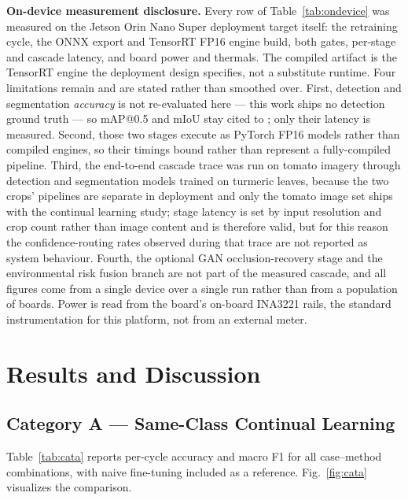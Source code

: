 \documentclass[journal]{IEEEtran}
\begin{document}
\textbf{On-device measurement disclosure.} Every row of
Table~\ref{tab:ondevice} was measured on the Jetson Orin Nano Super deployment
target itself: the retraining cycle, the ONNX export and TensorRT FP16 engine
build, both gates, per-stage and cascade latency, and board power and thermals.
The compiled artifact is the TensorRT engine the deployment design specifies, not a
substitute runtime. Four limitations remain and are stated rather than smoothed
over. First, detection and segmentation \emph{accuracy} is not re-evaluated here ---
this work ships no detection ground truth --- so mAP@0.5 and mIoU stay cited to
\cite{ref21}; only their latency is measured. Second, those two stages execute as
PyTorch FP16 models rather than compiled engines, so their timings bound rather than
represent a fully-compiled pipeline. Third, the end-to-end cascade trace was run on
tomato imagery through detection and segmentation models trained on turmeric leaves,
because the two crops' pipelines are separate in deployment and only the tomato
image set ships with the continual learning study; stage latency is set by input
resolution and crop count rather than image content and is therefore valid, but for
this reason the confidence-routing rates observed during that trace are not reported
as system behaviour. Fourth, the optional GAN occlusion-recovery stage and the
environmental risk fusion branch are not part of the measured cascade, and all
figures come from a single device over a single run rather than from a population of
boards. Power is read from the board's on-board INA3221 rails, the standard
instrumentation for this platform, not from an external meter.

\section{Results and Discussion}
\label{sec:results}

\subsection{Category A --- Same-Class Continual Learning}

Table~\ref{tab:cata} reports per-cycle accuracy and macro F1 for all case--method
combinations, with naive fine-tuning included as a reference. Fig.~\ref{fig:cata}
visualizes the comparison.
\end{document}
